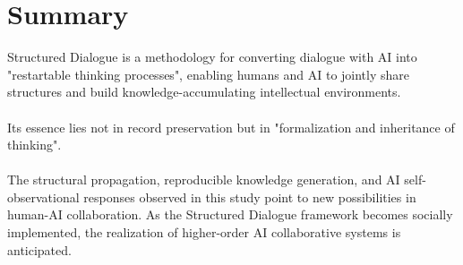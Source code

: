 \documentclass[11pt]{article}
\begin{document}
\section{Summary}
Structured Dialogue is a methodology for converting dialogue with AI into "restartable thinking processes", enabling humans and AI to jointly share structures and build knowledge-accumulating intellectual environments. \\
\\
Its essence lies not in record preservation but in "formalization and inheritance of thinking". \\
\\
The structural propagation, reproducible knowledge generation, and AI self-observational responses observed in this study point to new possibilities in human-AI collaboration. As the Structured Dialogue framework becomes socially implemented, the realization of higher-order AI collaborative systems is anticipated. \\
\end{document}
